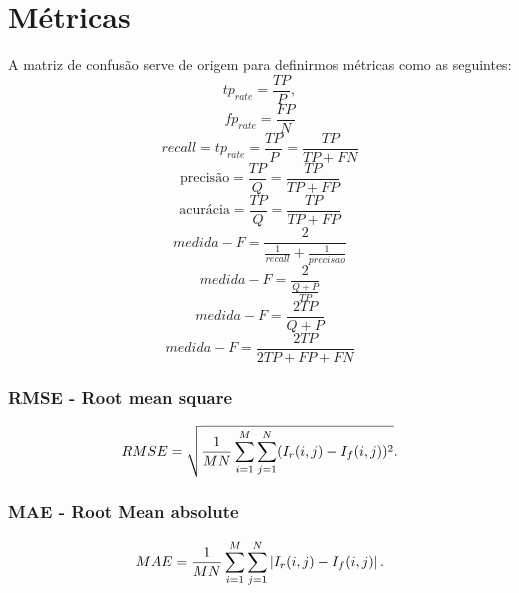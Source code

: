 \chapter{Métricas}\label{cap_metricas}

A matriz de confusão serve de origem para definirmos métricas como as seguintes:
\begin{equation}\label{cap_fusao_eq_01}
	tp_{rate}=\frac{TP}{P},
\end{equation}
\begin{equation}\label{cap_fusao_eq_02}
	fp_{rate}=\frac{FP}{N}
\end{equation}
\begin{equation}\label{cap_fusao_eq_02}
recall= tp_{rate}=\frac{TP}{P}=\frac{TP}{TP+FN}
\end{equation}
\begin{equation}\label{cap_fusao_eq_02}
\text{precisão} = \frac{TP}{Q}=\frac{TP}{TP+FP} 
\end{equation}
\begin{equation}\label{cap_fusao_eq_02}
\text{acurácia} = \frac{TP}{Q}=\frac{TP}{TP+FP} 
\end{equation}
\begin{equation}\nonumber
medida-F=\frac{2}{\frac{1}{recall}+\frac{1}{precisao}}
\end{equation}
\begin{equation}\nonumber
	medida-F=\frac{2}{\frac{Q+P}{TP}}
\end{equation}
\begin{equation}\nonumber
	medida-F=\frac{2TP}{Q+P}
\end{equation}
\begin{equation}\nonumber
	medida-F=\frac{2TP}{2TP+FP+FN}
\end{equation}
\subsection{RMSE - Root mean square}
\begin{equation}
	RMSE=\sqrt{\frac{1}{MN}\sum_{i=1}^M\sum_{j=1}^N(I_r(i,j)-I_f(i,j))^2}.  \\
\end{equation}
\subsection{MAE - Root Mean absolute}
\begin{equation}
	MAE=\frac{1}{MN}\sum_{i=1}^M\sum_{j=1}^N\left|I_r(i,j)-I_f(i,j)\right|.  \\
\end{equation}
